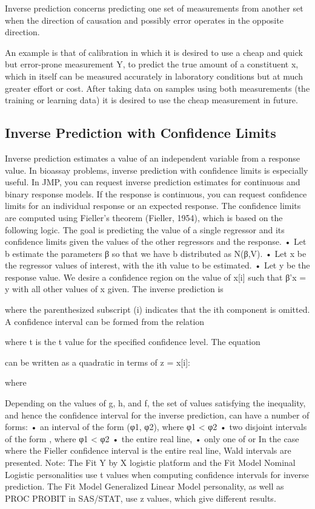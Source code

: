 
Inverse prediction concerns predicting one set of measurements from another set when the 
direction of causation and possibly error operates in the opposite direction. 

An example is that of calibration in which it is desired to use a cheap and quick but error-prone measurement Y, to 
predict the true amount of a constituent x, which in itself can be measured accurately in laboratory conditions but 
at much greater effort or cost. After taking data on samples using both measurements (the training or learning data)
it is desired to use the cheap measurement in future.

\subsection{Inverse Prediction with Confidence Limits}
Inverse prediction estimates a value of an independent variable from a response value. In bioassay problems, inverse prediction with confidence limits is especially useful. In JMP, you can request inverse prediction estimates for continuous and binary response models. If the response is continuous, you can request confidence limits for an individual response or an expected response.
The confidence limits are computed using Fieller’s theorem (Fieller, 1954), which is based on the following logic. The goal is predicting the value of a single regressor and its confidence limits given the values of the other regressors and the response.
•
Let b estimate the parameters β so that we have b distributed as N(β,V).
•
Let x be the regressor values of interest, with the ith value to be estimated.
•
Let y be the response value.
We desire a confidence region on the value of x[i] such that β’x = y with all other values of x given.
The inverse prediction is

where the parenthesized subscript (i) indicates that the ith component is omitted. A confidence interval can be formed from the relation

where t is the t value for the specified confidence level.
The equation

can be written as a quadratic in terms of z = x[i]:

where



Depending on the values of g, h, and f, the set of values satisfying the inequality, and hence the confidence interval for the inverse prediction, can have a number of forms:
•
an interval of the form (φ1, φ2), where φ1 < φ2
•
two disjoint intervals of the form , where φ1 < φ2
•
the entire real line,
•
only one of  or
In the case where the Fieller confidence interval is the entire real line, Wald intervals are presented.
Note: The Fit Y by X logistic platform and the Fit Model Nominal Logistic personalities use t values when computing confidence intervals for inverse prediction. The Fit Model Generalized Linear Model personality, as well as PROC PROBIT in SAS/STAT, use z values, which give different results.

